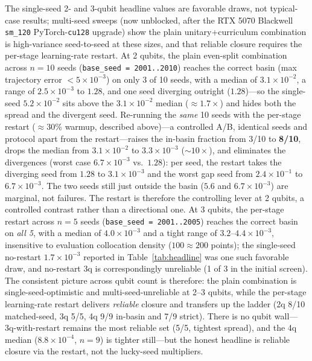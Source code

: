 \documentclass[11pt]{article}
\begin{document}
The single-seed 2- and 3-qubit headline values are favorable draws, not typical-case results; multi-seed sweeps (now unblocked, after the RTX 5070 Blackwell \texttt{sm\_120} PyTorch-\texttt{cu128} upgrade) show the plain unitary+curriculum combination is high-variance seed-to-seed at these sizes, and that reliable closure requires the per-stage learning-rate restart. At 2 qubits, the plain even-split combination across $n = 10$ seeds (\texttt{base\_seed = 2001..2010}) reaches the correct basin (max trajectory error $< 5\times10^{-3}$) on only 3 of 10 seeds, with a median of $3.1\times10^{-2}$, a range of $2.5\times10^{-3}$ to $1.28$, and one seed diverging outright ($1.28$)---so the single-seed $5.2\times10^{-2}$ sits above the $3.1\times10^{-2}$ median ($\approx\!1.7\times$) and hides both the spread and the divergent seed. Re-running the \emph{same} 10 seeds with the per-stage restart ($\approx\!30\%$ warmup, described above)---a controlled A/B, identical seeds and protocol apart from the restart---raises the in-basin fraction from 3/10 to \textbf{8/10}, drops the median from $3.1\times10^{-2}$ to $3.3\times10^{-3}$ ($\sim\!10\times$), and eliminates the divergences (worst case $6.7\times10^{-3}$ vs.\ $1.28$): per seed, the restart takes the diverging seed from $1.28$ to $3.1\times10^{-3}$ and the worst gap seed from $2.4\times10^{-1}$ to $6.7\times10^{-3}$. The two seeds still just outside the basin ($5.6$ and $6.7\times10^{-3}$) are marginal, not failures. The restart is therefore the controlling lever at 2 qubits, a controlled contrast rather than a directional one. At 3 qubits, the per-stage restart across $n = 5$ seeds (\texttt{base\_seed = 2001..2005}) reaches the correct basin on \emph{all 5}, with a median of $4.0\times10^{-3}$ and a tight range of $3.2$--$4.4\times10^{-3}$, insensitive to evaluation collocation density ($100 \approx 200$ points); the single-seed no-restart $1.7\times10^{-3}$ reported in Table~\ref{tab:headline} was one such favorable draw, and no-restart 3q is correspondingly unreliable (1 of 3 in the initial screen). The consistent picture across qubit count is therefore: the plain combination is single-seed-optimistic and multi-seed-unreliable at 2--3 qubits, while the per-stage learning-rate restart delivers \emph{reliable} closure and transfers up the ladder (2q 8/10 matched-seed, 3q 5/5, 4q 9/9 in-basin and 7/9 strict). There is no qubit wall---3q-with-restart remains the most reliable set (5/5, tightest spread), and the 4q median ($8.8\times10^{-4}$, $n = 9$) is tighter still---but the honest headline is reliable closure via the restart, not the lucky-seed multipliers.
\end{document}
